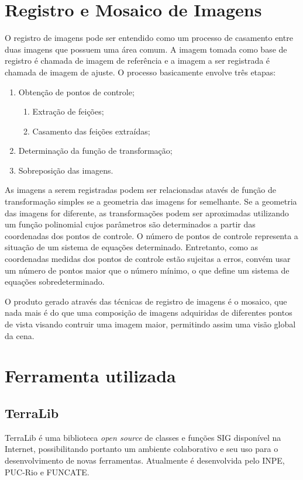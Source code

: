 \documentclass[9pt, a4paper, nofonttune, journal]{IEEEtran}
\begin{document}
\section{Registro e Mosaico de Imagens}
O registro de imagens pode ser entendido como um processo de casamento entre duas imagens que possuem uma área comum.
A imagem tomada como base de registro é chamada de imagem de referência e a imagem a ser registrada é chamada de imagem de ajuste.
O processo basicamente envolve três etapas:
\begin{enumerate}
	\item Obtenção de pontos de controle;
	\begin{enumerate}
		\item Extração de feições;
		\item Casamento das feições extraídas;
	\end{enumerate}
	\item Determinação da função de transformação;
	\item Sobreposição das imagens.
\end{enumerate}

As imagens a serem registradas podem ser relacionadas atavés de função de transformação simples se a geometria das imagens for semelhante.
Se a geometria das imagens for diferente, as transformações podem ser aproximadas utilizando um função polinomial cujos parâmetros são determinados 
a partir das coordenadas dos pontos de controle.
O número de pontos de controle representa a situação de um sistema de equações determinado.
Entretanto, como as coordenadas medidas dos pontos de controle estão sujeitas a erros, convém usar um número de pontos maior que o número mínimo,
o que define um sistema de equações sobredeterminado.

O produto gerado através das técnicas de registro de imagens é o mosaico, que nada mais é do que uma 
composição de imagens adquiridas de diferentes pontos de vista visando contruir uma imagem maior, permitindo assim uma visão global da cena.\cite{Fedorov1}

\section{Ferramenta utilizada}

\subsection{TerraLib}
TerraLib é uma biblioteca \textit{open source} de classes e funções SIG disponível na Internet, possibilitando portanto um ambiente colaborativo e seu uso
para o desenvolvimento de novas ferramentas. Atualmente é desenvolvida pelo INPE, PUC-Rio e FUNCATE.\cite{Terralib1}
\end{document}
